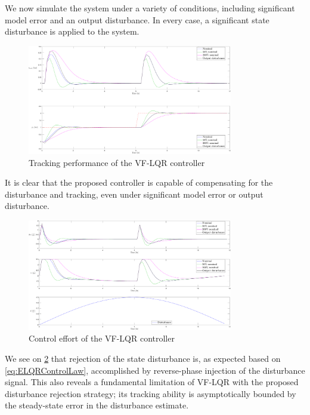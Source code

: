 \clearpage

We now simulate the system under a variety of conditions, including significant model error and an output disturbance. In every case, a significant state disturbance is applied to the system.

\begin{figure}[h!]
	\centering
	\includegraphics[width=0.8\textwidth]{Pictures/LQRTracking.pdf}
	\caption{Tracking performance of the VF-LQR controller}
	\label{fig:LQRTracking}
\end{figure}

It is clear that the proposed controller is capable of compensating for the disturbance and tracking, even under significant model error or output disturbance.

\begin{figure}[h!]
	\centering
	\includegraphics[width=0.8\textwidth]{Pictures/LQRControls.pdf}
	\caption{Control effort of the VF-LQR controller}
	\label{fig:LQRControls}
\end{figure}

We see on \cref{fig:LQRControls} that rejection of the state disturbance is, as expected based on \cref{eq:ELQRControlLaw}, accomplished by reverse-phase injection of the disturbance signal. This also reveals a fundamental limitation of VF-LQR with the proposed disturbance rejection strategy; its tracking ability is asymptotically bounded by the steady-state error in the disturbance estimate.


